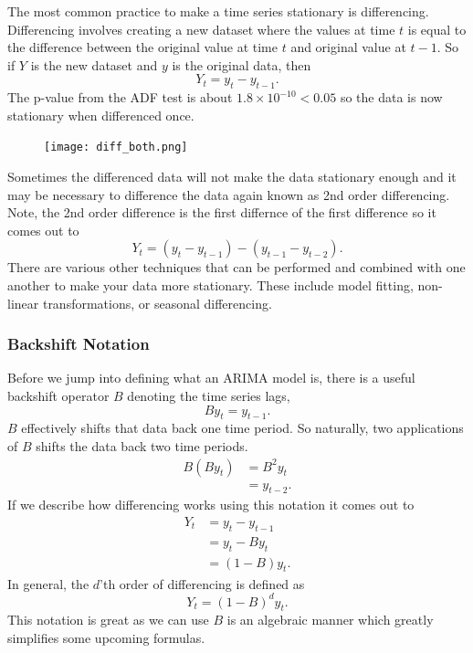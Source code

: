 \documentclass{article}
\begin{document}
    The most common practice to make a time series stationary is differencing. Differencing involves creating a new dataset where the values at time $t$ is equal to the difference between the original value at time $t$ and original value at $t-1$. So if $Y$ is the new dataset and $y$ is the original data, then
    \begin{equation*}
      Y_t = y_t - y_{t-1}.
    \end{equation*}
    The p-value from the ADF test is about $1.8 \times 10^{-10} < 0.05$ so the data is now stationary when differenced once.
    \begin{figure}[H]
      \centering
      \texttt{[image: diff\_both.png]}
    \end{figure}
    Sometimes the differenced data will not make the data stationary enough and it may be necessary to difference the data again known as 2nd order differencing. Note, the 2nd order difference is the first differnce of the first difference so it comes out to
    \begin{equation*}
      Y_t = (y_t - y_{t-1}) - (y_{t-1} - y_{t-2}).
    \end{equation*}
    There are various other techniques that can be performed and combined with one another to make your data more stationary. These include model fitting, non-linear transformations, or seasonal differencing.

    \subsubsection{Backshift Notation}
    Before we jump into defining what an ARIMA model is, there is a useful backshift operator $B$ denoting the time series lags,
    \begin{equation*}
      By_t = y_{t-1}.
    \end{equation*}
    $B$ effectively shifts that data back one time period. So naturally, two applications of $B$ shifts the data back two time periods. 
    \begin{align*}
      B(By_t) &= B^2y_t \\
      &= y_{t-2}.
    \end{align*}
    If we describe how differencing works using this notation it comes out to
    \begin{align*}
      Y_t &= y_t - y_{t-1} \\
      &= y_t - By_t \\
      &= (1 - B)y_t.
    \end{align*}
    In general, the $d$'th order of differencing is defined as 
    \begin{equation*}
      Y_t = (1 - B)^dy_t.
    \end{equation*}
    This notation is great as we can use $B$ is an algebraic manner which greatly simplifies some upcoming formulas.
\end{document}

